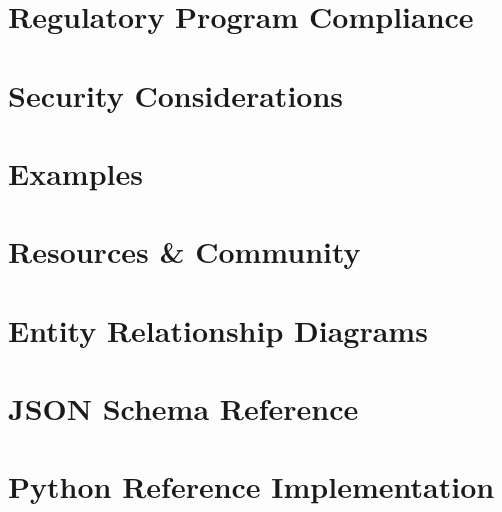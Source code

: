 \documentclass{article}
\begin{document}

\section{Regulatory Program Compliance}
\label{sec:regulatory-compliance}


\section{Security Considerations}
\label{sec:security}



\section{Examples}
\label{sec:examples}


\section{Resources \& Community}
\label{sec:resources-community}



\appendix

\section{Entity Relationship Diagrams}
\label{app:erd}


\section{JSON Schema Reference}
\label{app:schema-reference}


\section{Python Reference Implementation}
\label{app:python-implementation}

\end{document}

